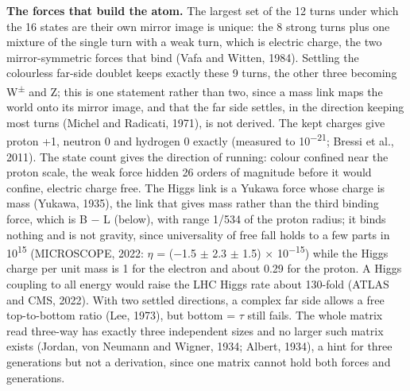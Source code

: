 \documentclass[
  11pt,
]{article}
\begin{document}
\textbf{The forces that build the atom.} The largest set of the 12 turns under which the 16 states are their own mirror image is unique: the 8 strong turns plus one mixture of the single turn with a weak turn, which is electric charge, the two mirror-symmetric forces that bind (Vafa and Witten, 1984). Settling the colourless far-side doublet keeps exactly these 9 turns, the other three becoming W\textsuperscript{\ensuremath{\pm}} and Z; this is one statement rather than two, since a mass link maps the world onto its mirror image, and that the far side settles, in the direction keeping most turns (Michel and Radicati, 1971), is not derived. The kept charges give proton +1, neutron 0 and hydrogen 0 exactly (measured to 10\textsuperscript{\ensuremath{-}21}; Bressi et al., 2011). The state count gives the direction of running: colour confined near the proton scale, the weak force hidden 26 orders of magnitude before it would confine, electric charge free. The Higgs link is a Yukawa force whose charge is mass (Yukawa, 1935), the link that gives mass rather than the third binding force, which is B \ensuremath{-} L (below), with range 1/534 of the proton radius; it binds nothing and is not gravity, since universality of free fall holds to a few parts in 10\textsuperscript{15} (MICROSCOPE, 2022: \ensuremath{\eta} = (\ensuremath{-}1.5 \ensuremath{\pm} 2.3 \ensuremath{\pm} 1.5) \ensuremath{\times} 10\textsuperscript{\ensuremath{-}15}) while the Higgs charge per unit mass is 1 for the electron and about 0.29 for the proton. A Higgs coupling to all energy would raise the LHC Higgs rate about 130-fold (ATLAS and CMS, 2022). With two settled directions, a complex far side allows a free top-to-bottom ratio (Lee, 1973), but bottom = \ensuremath{\tau} still fails. The whole matrix read three-way has exactly three independent sizes and no larger such matrix exists (Jordan, von Neumann and Wigner, 1934; Albert, 1934), a hint for three generations but not a derivation, since one matrix cannot hold both forces and generations.
\end{document}
